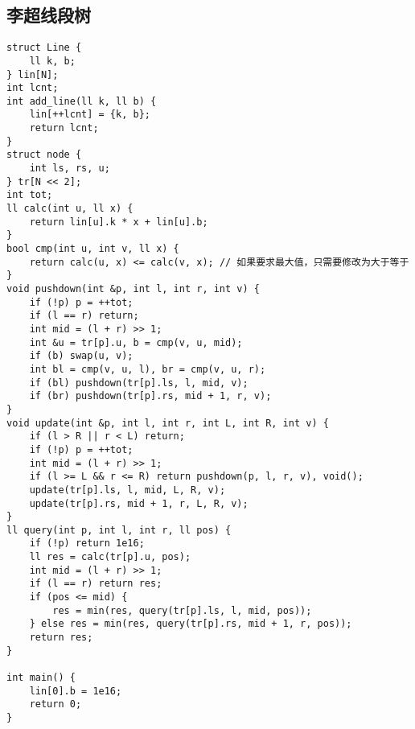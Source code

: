 \documentclass[a4paper]{article}
\begin{document}
\subsection{李超线段树}
\begin{lstlisting}
struct Line {
	ll k, b;
} lin[N];
int lcnt;
int add_line(ll k, ll b) {
	lin[++lcnt] = {k, b};
	return lcnt;
}
struct node {
	int ls, rs, u;
} tr[N << 2];
int tot;
ll calc(int u, ll x) {
	return lin[u].k * x + lin[u].b;
}
bool cmp(int u, int v, ll x) {
	return calc(u, x) <= calc(v, x); // 如果要求最大值，只需要修改为大于等于
}
void pushdown(int &p, int l, int r, int v) {
	if (!p) p = ++tot;
	if (l == r) return;
	int mid = (l + r) >> 1;
	int &u = tr[p].u, b = cmp(v, u, mid);
	if (b) swap(u, v);
	int bl = cmp(v, u, l), br = cmp(v, u, r);
	if (bl) pushdown(tr[p].ls, l, mid, v);
	if (br) pushdown(tr[p].rs, mid + 1, r, v);
}
void update(int &p, int l, int r, int L, int R, int v) {
	if (l > R || r < L) return;
	if (!p) p = ++tot;
	int mid = (l + r) >> 1;
	if (l >= L && r <= R) return pushdown(p, l, r, v), void();
	update(tr[p].ls, l, mid, L, R, v);
	update(tr[p].rs, mid + 1, r, L, R, v);
}
ll query(int p, int l, int r, ll pos) {
	if (!p) return 1e16;
	ll res = calc(tr[p].u, pos);
	int mid = (l + r) >> 1;
	if (l == r) return res;
	if (pos <= mid) {
		res = min(res, query(tr[p].ls, l, mid, pos));
	} else res = min(res, query(tr[p].rs, mid + 1, r, pos));
	return res;
}

int main() {
	lin[0].b = 1e16;
	return 0;	
}
\end{lstlisting}
\end{document}

